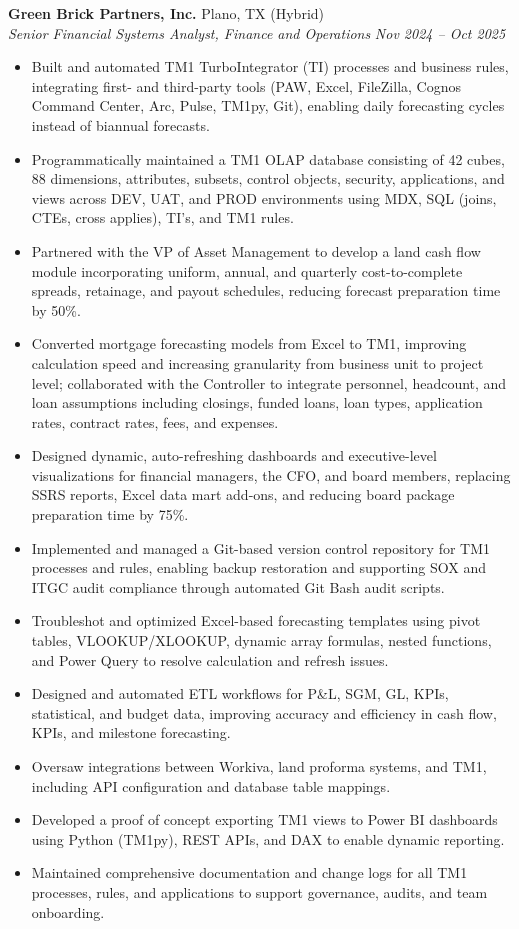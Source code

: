 \documentclass[a4paper,11pt]{article}
\begin{document}
\vspace{1mm}
\textbf{Green Brick Partners, Inc.} \hfill Plano, TX (Hybrid) \\
\textit{Senior Financial Systems Analyst, Finance and Operations} \hfill \textit{Nov 2024 -- Oct 2025} 
\begin{itemize}
\item Built and automated TM1 TurboIntegrator (TI) processes and business rules, integrating first- and third-party tools (PAW, Excel, FileZilla, Cognos Command Center, Arc, Pulse, TM1py, Git), enabling daily forecasting cycles instead of biannual forecasts.
\item Programmatically maintained a TM1 OLAP database consisting of 42 cubes, 88 dimensions, attributes, subsets, control objects, security, applications, and views across DEV, UAT, and PROD environments using MDX, SQL (joins, CTEs, cross applies), TI's, and TM1 rules.
\item Partnered with the VP of Asset Management to develop a land cash flow module incorporating uniform, annual, and quarterly cost-to-complete spreads, retainage, and payout schedules, reducing forecast preparation time by 50\%.
\item Converted mortgage forecasting models from Excel to TM1, improving calculation speed and increasing granularity from business unit to project level; collaborated with the Controller to integrate personnel, headcount, and loan assumptions including closings, funded loans, loan types, application rates, contract rates, fees, and expenses.
\item Designed dynamic, auto-refreshing dashboards and executive-level visualizations for financial managers, the CFO, and board members, replacing SSRS reports, Excel data mart add-ons, and reducing board package preparation time by 75\%.
\item Implemented and managed a Git-based version control repository for TM1 processes and rules, enabling backup restoration and supporting SOX and ITGC audit compliance through automated Git Bash audit scripts.
\item Troubleshot and optimized Excel-based forecasting templates using pivot tables, VLOOKUP/XLOOKUP, dynamic array formulas, nested functions, and Power Query to resolve calculation and refresh issues.
\item Designed and automated ETL workflows for P\&L, SGM, GL, KPIs, statistical, and budget data, improving accuracy and efficiency in cash flow, KPIs, and milestone forecasting.
\item Oversaw integrations between Workiva, land proforma systems, and TM1, including API configuration and database table mappings.
\item Developed a proof of concept exporting TM1 views to Power BI dashboards using Python (TM1py), REST APIs, and DAX to enable dynamic reporting.
\item Maintained comprehensive documentation and change logs for all TM1 processes, rules, and applications to support governance, audits, and team onboarding.
\end{itemize}
\end{document}
